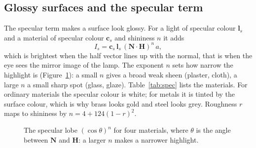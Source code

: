 \documentclass[10pt,a4paper]{article}
\begin{document}
\subsection{Glossy surfaces and the specular term}
The specular term makes a surface look glossy. For a light of specular colour $\mathbf l_s$ and a material of specular colour $\mathbf c_s$ and shininess $n$ it adds
\begin{equation}
I_s=\mathbf c_s\,\mathbf l_s\,(\mathbf N\!\cdot\!\mathbf H)^{n}\,a,
\end{equation}
which is brightest when the half vector lines up with the normal, that is when the eye sees the mirror image of the lamp. The exponent $n$ sets how narrow the highlight is (Figure~\ref{fig:lobe}): a small $n$ gives a broad weak sheen (plaster, cloth), a large $n$ a small sharp spot (glass, glaze). Table~\ref{tab:spec} lists the materials. For ordinary materials the specular colour is white; for metals it is tinted by the surface colour, which is why brass looks gold and steel looks grey. Roughness $r$ maps to shininess by $n=4+124(1-r)^2$.
\begin{figure}[htbp]
\centering
{}
\caption{The specular lobe $(\cos\theta)^n$ for four materials, where $\theta$ is the angle between $\mathbf N$ and $\mathbf H$: a larger $n$ makes a narrower highlight.}\label{fig:lobe}
\end{figure}
\end{document}
